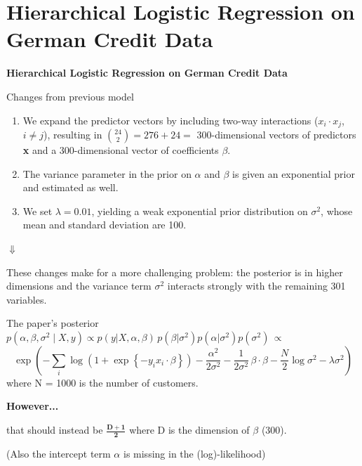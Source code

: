 \documentclass[aspectratio=43]{beamer}
\begin{document}
\section{Hierarchical Logistic Regression on German Credit Data}
\begin{frame}
	\begin{center}
		{\Huge \textbf{Hierarchical Logistic Regression on German Credit Data}}
	\end{center}
\end{frame}
\begin{frame}{Changes from previous model}
	\begin{enumerate}
		\item We expand the predictor vectors by including two-way interactions ($x_i \cdot x_j$, $i \neq j$), resulting in $\binom{24}{2} = 276 + 24 =$ 300-dimensional vectors of predictors \textbf{x} and a 300-dimensional vector of coefficients \textbf{$\beta$}.
		\item The variance parameter in
		the prior on $\alpha$ and $\beta$ is given an exponential prior and estimated as well.
		\item  We set $\lambda = 0.01$, yielding a weak exponential prior distribution on $\sigma^2$,  whose mean and standard deviation are 100.
	\end{enumerate}
	
	\begin{center}
		$\Downarrow$
		
		These changes make for a more challenging problem: the posterior is in higher dimensions and the variance term $\sigma^2$ interacts strongly with the remaining 301 variables.
	\end{center}
\end{frame}

\begin{frame}{The paper's posterior}
	$p(\alpha, \beta , \sigma^2 \mid X, y) \propto  p(y|X, \alpha, \beta) \, p(\beta| \sigma^2) p(\alpha|\sigma^2) p(\sigma^2) \, \propto
	$
	$$
	\exp\left(
	-\sum_{i}\log\!\left(1+\exp\!\left\{-y_i x_i \cdot \beta\right\}\right)
	-\frac{\alpha^2}{2\sigma^2}
	-\frac{1}{2\sigma^2}\,\beta \cdot \beta - \frac{N}{2}\log{\sigma^2} - \lambda \sigma^2
	\right)
	$$
	where N = 1000 is the number of customers.
	
	\begin{center}
		{\Large \textbf{However...}}
		
		\Large
		that should instead be $\mathbf{\frac{D+1}{2}}$ where D is the dimension of $\beta$ (300).
		
	\end{center}
	
	\begin{center}
		(Also the intercept term $\alpha$ is missing in the (log)-likelihood)
	\end{center}
\end{frame}
\end{document}
